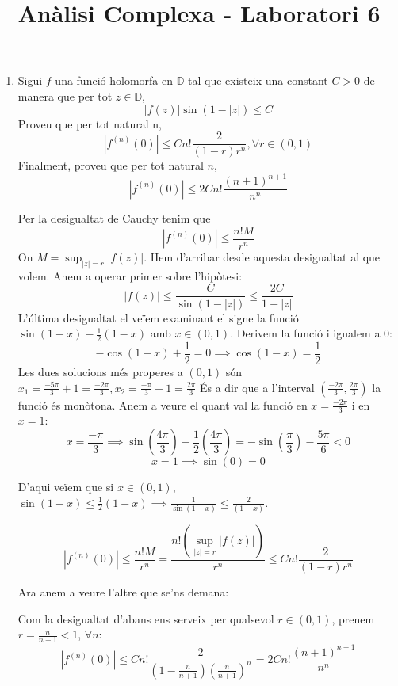 \documentclass[10pt,a4paper]{article}
\author{ }
\title{Anàlisi Complexa - Laboratori 6}
\begin{document}
\maketitle

\begin{enumerate}
\item Sigui $f$ una funció holomorfa en $\mathbb{D}$ tal que existeix una constant $C>0$ de manera que per tot $z\in\mathbb{D}$,
$$|f(z)|\sin (1-|z|)\leq C$$Proveu que per tot natural n,
$$|f^{(n)}(0)|\leq C n! \frac{2}{(1-r)r^{n}}, \forall r\in(0,1)$$
Finalment, proveu que per tot natural $n$,
$$|f^{(n)}(0)|\leq 2 C n! \frac{(n+1)^{n+1}}{n^{n}}$$
\begin{framed}
Per la desigualtat de Cauchy tenim que
$$|f^{(n)}(0)|\leq\frac{n!M}{r^{n}}$$
On $M=\sup_{|z|=r}|f(z)|$. Hem d'arribar desde aquesta desigualtat al que volem. Anem a operar primer sobre l'hipòtesi:
$$|f(z)|\leq \frac{C}{\sin (1-|z|)}\leq \frac{2C}{1-|z|}$$
L'última desigualtat el veïem examinant el signe la funció $\sin(1-x) - \frac{1}{2}(1-x)$ amb $x\in(0,1)$. Derivem la funció i igualem a 0:
$$-\cos(1-x) + \frac{1}{2} = 0 \implies \cos(1-x) = \frac{1}{2}$$
Les dues solucions més properes a $(0,1)$ són $x_{1}=\frac{-5\pi}{3}+1=\frac{-2\pi}{3}, x_{2}=\frac{-\pi}{3}+1=\frac{2\pi}{3}$
És a dir que a l'interval $(\frac{-2\pi}{3},\frac{2\pi}{3})$ la funció és monòtona. Anem a veure el quant val la funció en $x=\frac{-2\pi}{3}$ i en $x=1$:
$$x=\frac{-\pi}{3} \implies \sin\left(\frac{4\pi}{3}\right) - \frac{1}{2}\left(\frac{4\pi}{3}\right) = 
-\sin\left(\frac{\pi}{3}\right)-\frac{5\pi}{6} < 0$$
$$x=1 \implies \sin(0) = 0$$

D'aqui veïem que si $x\in(0,1)$, $\sin(1-x) \leq \frac{1}{2}(1-x) \implies \frac{1}{\sin(1-x)} \leq \frac{2}{(1-x)}$.

$$|f^{(n)}(0)|\leq\frac{n!M}{r^{n}} = \frac{n!(\sup_{|z|=r}|f(z)|)}{r^{n}} \leq C n! \frac{2}{(1-r)r^{n}}$$

Ara anem a veure l'altre que se'ns demana:

Com la desigualtat d'abans ens serveix per qualsevol $r\in(0,1)$, prenem $r=\frac{n}{n+1}<1$, $\forall n$:
$$|f^{(n)}(0)|\leq Cn!\frac{2}{\left(1-\frac{n}{n+1}\right)\left(\frac{n}{n+1}\right)^{n}} = 2 C n! \frac{(n+1)^{n+1}}{n^{n}}$$


\end{framed}
\end{enumerate}
\end{document}
